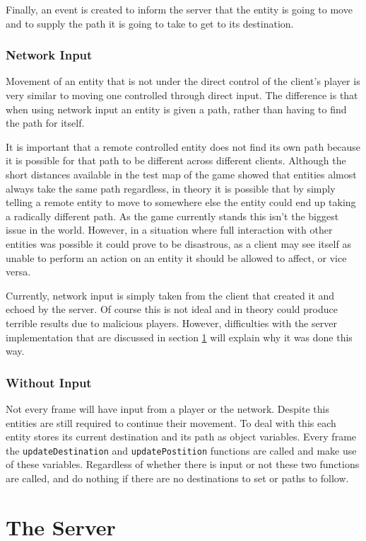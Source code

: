 Finally, an event is created to inform the server that the entity is going to move and to supply the path it is going to take to get to its destination.

\subsubsection{Network Input}
Movement of an entity that is not under the direct control of the client's player is very similar to moving one controlled through direct input. The difference is that when using network input an entity is given a path, rather than having to find the path for itself.

It is important that a remote controlled entity does not find its own path because it is possible for that path to be different across different clients. Although the short distances available in the test map of the game showed that entities almost always take the same path regardless, in theory it is possible that by simply telling a remote entity to move to somewhere else the entity could end up taking a radically different path. As the game currently stands this isn't the biggest issue in the world. However, in a situation where full interaction with other entities was possible it could prove to be disastrous, as a client may see itself as unable to perform an action on an entity it should be allowed to affect, or vice versa.

Currently, network input is simply taken from the client that created it and echoed by the server. Of course this is not ideal and in theory could produce terrible results due to malicious players. However, difficulties with the server implementation that are discussed in section \ref{server_implementation} will explain why it was done this way.

\subsubsection{Without Input}
Not every frame will have input from a player or the network. Despite this entities are still required to continue their movement. To deal with this each entity stores its current destination and its path as object variables. Every frame the \texttt{updateDestination} and \texttt{updatePostition} functions are called and make use of these variables. Regardless of whether there is input or not these two functions are called, and do nothing if there are no destinations to set or paths to follow.

\section{The Server}\label{server_implementation}


